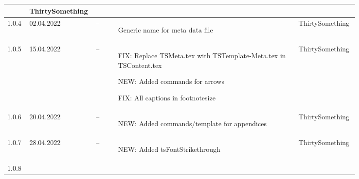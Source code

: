 \begin{tiny}
\begin{longtable}{ | p{0.06\linewidth} | p{0.08\linewidth} | p{0.06\linewidth} | p{0.49\linewidth} | p{0.15\linewidth} | }
                                 &
        ThirtySomething            \\
        \hline
        1.0.4                    &
        02.04.2022               &
        --                       &
        \begin{tsLTItemize}
            \item Generic name for meta data file
        \end{tsLTItemize}
                                 &
        ThirtySomething            \\
        \hline
        1.0.5                    &
        15.04.2022               &
        --                       &
        \begin{tsLTItemize}
            \item FIX: Replace TSMeta.tex with TSTemplate-Meta.tex in TSContent.tex
            \item NEW: Added commands for arrows
            \item FIX: All captions in footnotesize
        \end{tsLTItemize}
                                 &
        ThirtySomething            \\
        \hline
        1.0.6                    &
        20.04.2022               &
        --                       &
        \begin{tsLTItemize}
            \item NEW: Added commands/template for appendices
        \end{tsLTItemize}
                                 &
        ThirtySomething            \\
        \hline
        1.0.7                    &
        28.04.2022               &
        --                       &
        \begin{tsLTItemize}
            \item NEW: Added tsFontStrikethrough
        \end{tsLTItemize}
                                 &
        ThirtySomething            \\
        \hline
        1.0.8                    &

\end{longtable}
\end{tiny}
